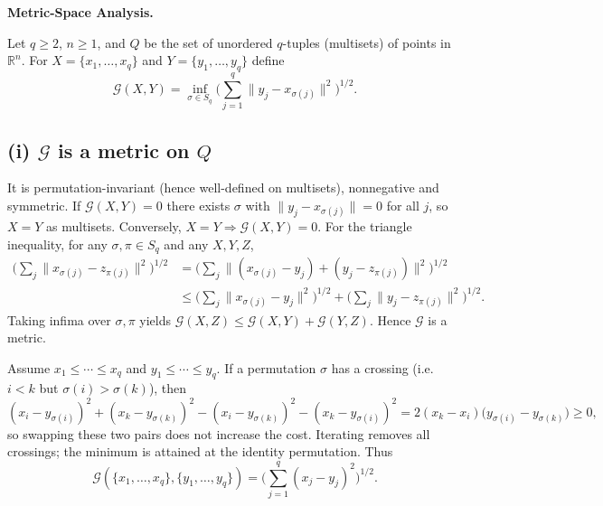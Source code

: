 \begin{problem}[CP-II-0311]
\label{prob:cp-ii-0311}
\textbf{Metric-Space Analysis.}

\hspace*{1.5em}Let $q\ge 2$, $n\ge 1$, and $Q$ be the set of unordered $q$-tuples (multisets) of points in $\mathbb{R}^n$.
For $X=\{x_1,\dots,x_q\}$ and $Y=\{y_1,\dots,y_q\}$ define
\[
\mathcal{G}(X,Y)=\inf_{\sigma\in S_q}
\Big(\sum_{j=1}^q \|y_j-x_{\sigma(j)}\|^2\Big)^{1/2}.
\]

\subsection*{(i) $\mathcal{G}$ is a metric on $Q$}
It is permutation-invariant (hence well-defined on multisets), nonnegative and symmetric.
If $\mathcal{G}(X,Y)=0$ there exists $\sigma$ with $\|y_j-x_{\sigma(j)}\|=0$ for all $j$, so $X=Y$ as multisets. Conversely, $X=Y \Rightarrow \mathcal{G}(X,Y)=0$.
For the triangle inequality, for any $\sigma,\pi\in S_q$ and any $X,Y,Z$,
\[
\begin{aligned}
	\Big(\sum_{j}\|x_{\sigma(j)}-z_{\pi(j)}\|^2\Big)^{1/2}
	&=\Big(\sum_{j}\|(x_{\sigma(j)}-y_j)+(y_j-z_{\pi(j)})\|^2\Big)^{1/2}\\
	&\le \Big(\sum_{j}\|x_{\sigma(j)}-y_j\|^2\Big)^{1/2}
	+ \Big(\sum_{j}\|y_j-z_{\pi(j)}\|^2\Big)^{1/2}.
\end{aligned}
\]
Taking infima over $\sigma,\pi$ yields $\mathcal{G}(X,Z)\le \mathcal{G}(X,Y)+\mathcal{G}(Y,Z)$.
Hence $\mathcal{G}$ is a metric.

Assume $x_1\le\cdots\le x_q$ and $y_1\le\cdots\le y_q$. If a permutation $\sigma$ has a crossing (i.e.\ $i<k$ but $\sigma(i)>\sigma(k)$), then
\[
(x_i-y_{\sigma(i)})^2+(x_k-y_{\sigma(k)})^2
-(x_i-y_{\sigma(k)})^2-(x_k-y_{\sigma(i)})^2
=2(x_k-x_i)\big(y_{\sigma(i)}-y_{\sigma(k)}\big)\ge0,
\]
so swapping these two pairs does not increase the cost. Iterating removes all crossings; the minimum is attained at the identity permutation. Thus
\[
\mathcal{G}(\{x_1,\dots,x_q\},\{y_1,\dots,y_q\})
=\Big(\sum_{j=1}^q (x_j-y_j)^2\Big)^{1/2}.
\]
\end{problem}

